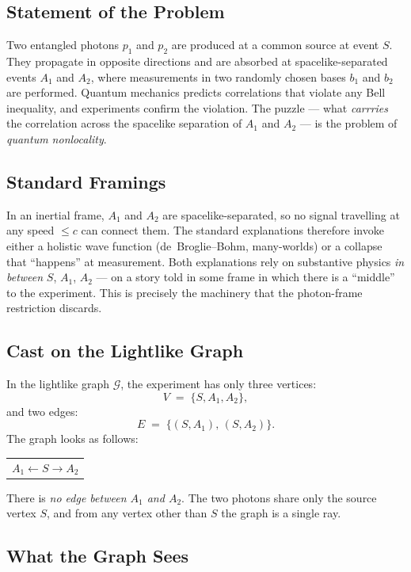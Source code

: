 \documentclass[11pt]{article}
\begin{document}
\subsection{Statement of the Problem}

Two entangled photons $p_1$ and $p_2$ are produced at a common source at event $S$. They propagate in opposite directions and are absorbed at spacelike-separated events $A_1$ and $A_2$, where measurements in two randomly chosen bases $b_1$ and $b_2$ are performed. Quantum mechanics predicts correlations that violate any Bell inequality, and experiments confirm the violation. The puzzle --- what \emph{carrries} the correlation across the spacelike separation of $A_1$ and $A_2$ --- is the problem of \emph{quantum nonlocality}.

\subsection{Standard Framings}

In an inertial frame, $A_1$ and $A_2$ are spacelike-separated, so no signal travelling at any speed $\leq c$ can connect them. The standard explanations therefore invoke either a holistic wave function (de~Broglie--Bohm, many-worlds) or a collapse that ``happens'' at measurement. Both explanations rely on substantive physics \emph{in between} $S$, $A_1$, $A_2$ --- on a story told in some frame in which there is a ``middle'' to the experiment. This is precisely the machinery that the photon-frame restriction discards.

\subsection{Cast on the Lightlike Graph}

In the lightlike graph $\mathcal{G}$, the experiment has only three vertices:
\[
V \;=\; \{S, A_1, A_2\},
\]
and two edges:
\[
E \;=\; \{(S, A_1), \, (S, A_2)\}.
\]
The graph looks as follows:
\begin{center}
\begin{tabular}{c}
$A_1 \leftarrow S \rightarrow A_2$ \\
\end{tabular}
\end{center}
There is \emph{no edge between $A_1$ and $A_2$}. The two photons share only the source vertex $S$, and from any vertex other than $S$ the graph is a single ray.

\subsection{What the Graph Sees}
\end{document}
